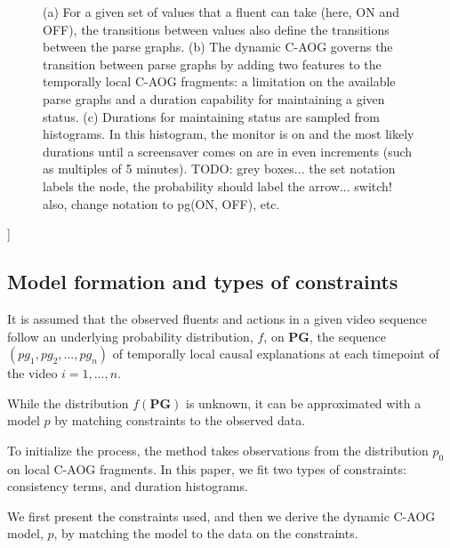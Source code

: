 \documentclass[10pt,journal,letterpaper,compsoc]{IEEEtran}
\begin{document}
\begin{figure}[htp]
\centering

\caption{(a) For a given set of values that a fluent can take (here, ON and OFF), the transitions between values also define the transitions between the parse graphs.  (b) The dynamic C-AOG governs the transition between parse graphs by adding two features to the temporally local C-AOG fragments: a limitation on the available parse graphs and a duration capability for maintaining a given status.  (c) Durations for maintaining status are sampled from histograms.  In this histogram, the monitor is on and the most likely durations until a screensaver comes on are in even increments (such as multiples of 5 minutes).
TODO: grey boxes...  the set notation labels the node, the probability should label the arrow...  switch!  also, change notation to pg(ON, OFF), etc.
 \label{fig:transitions}}
\end{figure}


]	

\subsection{Model formation and types of constraints}



It is assumed that the observed fluents and actions in a given video sequence follow an underlying probability distribution, $f$, on $\mathbf{PG}$, the sequence $(pg_1, pg_2, \ldots, pg_n)$ of temporally local causal explanations at each timepoint of the video $i = 1, \ldots, n$.  

While the distribution $f(\mathbf{PG})$ is unknown, it can be approximated with a model $p$ by matching constraints to the observed data.

To initialize the process, the method takes observations from the distribution $p_0$ on local C-AOG fragments.  In this paper, we fit two types of constraints: consistency terms, and duration histograms.

We first present the constraints used, and then we derive the dynamic C-AOG model, $p$, by matching the model to the data on the constraints.
\end{document}
